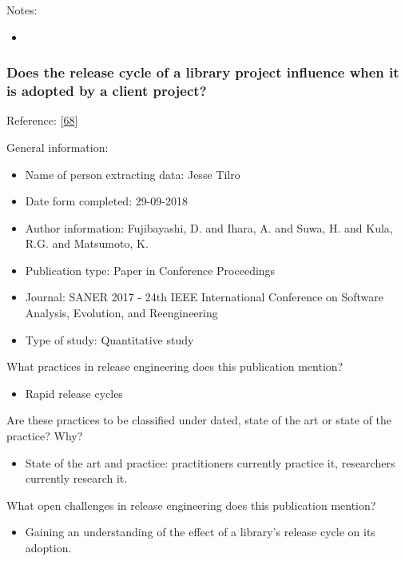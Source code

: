 \documentclass[]{book}
\providecommand{\tightlist}{%
  \setlength{\itemsep}{0pt}\setlength{\parskip}{0pt}}
\begin{document}
Notes:

\begin{itemize}
\item
\end{itemize}

\subsubsection{Does the release cycle of a library project influence
when it is adopted by a client
project?}\label{does-the-release-cycle-of-a-library-project-influence-when-it-is-adopted-by-a-client-project}

Reference: {[}\protect\hyperlink{ref-fujibayashi2017a}{68}{]}

General information:

\begin{itemize}
\tightlist
\item
  Name of person extracting data: Jesse Tilro
\item
  Date form completed: 29-09-2018
\item
  Author information: Fujibayashi, D. and Ihara, A. and Suwa, H. and
  Kula, R.G. and Matsumoto, K.
\item
  Publication type: Paper in Conference Proceedings
\item
  Journal: SANER 2017 - 24th IEEE International Conference on Software
  Analysis, Evolution, and Reengineering
\item
  Type of study: Quantitative study
\end{itemize}

What practices in release engineering does this publication mention?

\begin{itemize}
\tightlist
\item
  Rapid release cycles
\end{itemize}

Are these practices to be classified under dated, state of the art or
state of the practice? Why?

\begin{itemize}
\tightlist
\item
  State of the art and practice: practitioners currently practice it,
  researchers currently research it.
\end{itemize}

What open challenges in release engineering does this publication
mention?

\begin{itemize}
\tightlist
\item
  Gaining an understanding of the effect of a library's release cycle on
  its adoption.
\end{itemize}
\end{document}
